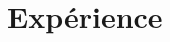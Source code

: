 \documentclass[11pt,a4paper,sans]{moderncv} %
\begin{document}




\makecvtitle %

\vspace{-1.4cm}

\section{Expérience}
\end{document}
